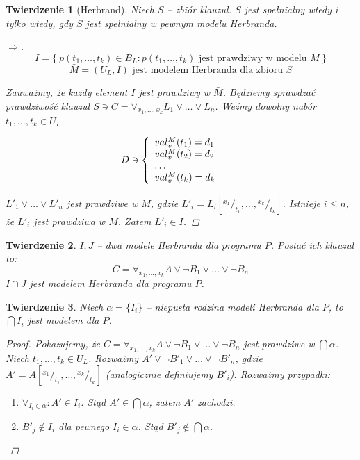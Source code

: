 \documentclass[10pt,a4paper]{article}
\theoremstyle{plain}
\newtheorem{theorem}{Twierdzenie}
\theoremstyle{definition}
\begin{document}
\begin{theorem}[Herbrand]
Niech $S$ -- zbiór klauzul. $S$ jest spełnialny wtedy i tylko wtedy, gdy $S$ jest spełnialny w pewnym modelu Herbranda.
\begin{proof}[$\Rightarrow$]
\[ I = \lbrace~p (t_1, \ldots, t_k) \in B_L : p (t_1, \ldots, t_k) \text{ jest prawdziwy w modelu } M~\rbrace \]
\[ \bar{M} = (U_L, I) \text{ jest modelem Herbranda dla zbioru } S \]

Zauważmy, że każdy element $I$ jest prawdziwy w $\bar{M}$. Będziemy sprawdzać prawdziwość klauzul
 $S \ni C = \forall_{x_1,\ldots,x_k} L_1 \lor \ldots \lor L_n$. Weźmy dowolny nabór $t_1,\ldots,t_k \in U_L$.

\[ D \ni \left\{ 
  \begin{array}{l l}
    val_{v}^{M}(t_1) = d_1 & \quad \\
    val_{v}^{M}(t_2) = d_2 & \quad \\
    \ldots & \quad \\
    val_{v}^{M}(t_k) = d_k & \quad
  \end{array} \right.\]

$L'_{1} \lor \ldots \lor L'_{n}$ jest prawdziwe w $M$, gdzie $L'_i = L_i [{}^{x_1}/_{t_1}, \ldots, {}^{x_k}/_{t_k}]$.
Istnieje $i \leq n$, że $L'_i$ jest prawdziwa w $M$. Zatem $L'_i \in I$.
\end{proof}
\end{theorem}

\begin{theorem}
$I, J$ -- dwa modele Herbranda dla programu $P$. Postać ich klauzul to:
\[ C = \forall_{x_1,\ldots,x_k} A \lor \lnot B_1 \lor \ldots \lor \lnot B_n \]
$I \cap J$ jest modelem Herbranda dla programu $P$.
\end{theorem}

\begin{theorem}
Niech $\alpha = \lbrace I_i \rbrace$ -- niepusta rodzina modeli Herbranda dla $P$, to $\bigcap I_i$ jest modelem dla $P$.
\begin{proof}
Pokazujemy, że $C = \forall_{x_1,\ldots,x_k} A \lor \lnot B_1 \lor \ldots \lor \lnot B_n$ jest prawdziwe w $\bigcap \alpha$.
Niech $t_1,\ldots,t_k \in U_L$. Rozważmy $A' \lor \lnot B'_1 \lor \ldots \lor \lnot B'_n$, gdzie $A' = A[{}^{x_1}/_{t_1}, \ldots, {}^{x_k}/_{t_k}]$
(analogicznie definiujemy $B'_i$). Rozważmy przypadki:

\begin{enumerate}
  \item $\forall_{I_i \in \alpha} : A' \in I_i$. Stąd $A' \in \bigcap \alpha$, zatem $A'$ zachodzi.
  \item $B'_j \not\in I_i$ dla pewnego $I_i \in \alpha$. Stąd $B'_j \not\in \bigcap \alpha$.
\end{enumerate}
\end{proof}
\end{theorem}
\end{document}
